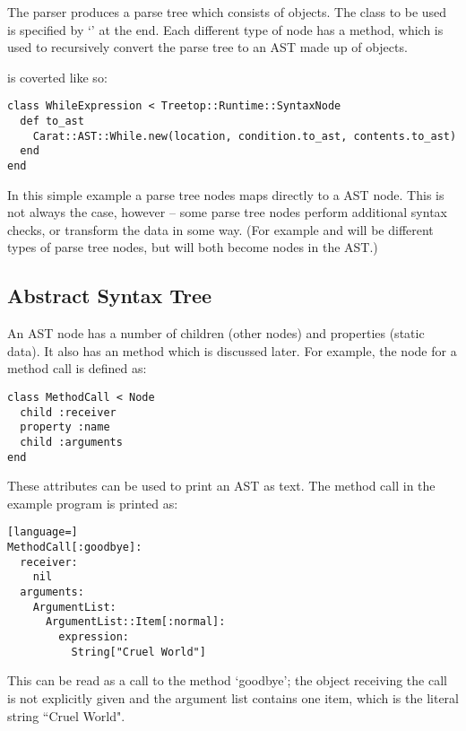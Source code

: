 The parser produces a parse tree which consists of  objects. The class to be used is specified by `' at the end. Each different type of node has a  method, which is used to recursively convert the parse tree to an AST made up of  objects.

 is coverted like so:

\begin{lstlisting}
class WhileExpression < Treetop::Runtime::SyntaxNode
  def to_ast
    Carat::AST::While.new(location, condition.to_ast, contents.to_ast)
  end
end
\end{lstlisting}

In this simple example a  parse tree nodes maps directly to a  AST node. This is not always the case, however -- some parse tree nodes perform additional syntax checks, or transform the data in some way. (For example  and  will be different types of parse tree nodes, but will both become  nodes in the AST.)

\subsection{Abstract Syntax Tree}

An AST node has a number of children (other nodes) and properties (static data). It also has an  method which is discussed later. For example, the node for a method call is defined as:

\begin{lstlisting}
class MethodCall < Node
  child :receiver
  property :name
  child :arguments
end
\end{lstlisting}

These attributes can be used to print an AST as text. The method call in the example program is printed as:

\begin{lstlisting}[language=]
MethodCall[:goodbye]:
  receiver:
    nil
  arguments:
    ArgumentList:
      ArgumentList::Item[:normal]:
        expression:
          String["Cruel World"]
\end{lstlisting}

This can be read as a call to the method `goodbye'; the object receiving the call is not explicitly given and the argument list contains one item, which is the literal string ``Cruel World".

